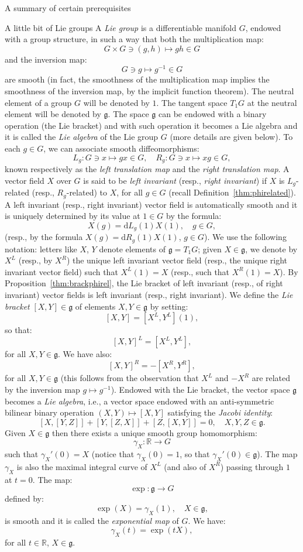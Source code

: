 \documentclass[oneside,a4paper,11pt]{amsbook}
\newcommand{\R}{\mathds R}
\newcommand{\dd}{\mathrm d}
\theoremstyle{remark}\newtheorem{exercise}{Exercise}[chapter]
\theoremstyle{plain}\newtheorem{teo}{Theorem}[section]
\theoremstyle{plain}\newtheorem{lem}[teo]{Lemma}
\theoremstyle{plain}\newtheorem{prop}[teo]{Proposition}
\theoremstyle{plain}\newtheorem{cor}[teo]{Corollary}
\theoremstyle{definition}\newtheorem{defin}[teo]{Definition}
\theoremstyle{remark}\newtheorem{rem}[teo]{Remark}
\theoremstyle{definition}\newtheorem{notation}[teo]{Notation}
\theoremstyle{definition}\newtheorem{convention}[teo]{Convention}
\theoremstyle{definition}\newtheorem{example}[teo]{Example}
\numberwithin{section}{chapter}
\numberwithin{equation}{section}
\begin{document}
\begin{chapter}{A summary of certain prerequisites}
\begin{section}{A little bit of Lie groups}
A {\em Lie group\/} is a differentiable manifold $G$, endowed with a group structure, in such a way that both the multiplication map:
\[G\times G\ni(g,h)\longmapsto gh\in G\]
and the inversion map:
\[G\ni g\longmapsto g^{-1}\in G\]
are smooth (in fact, the smoothness of the multiplication map
implies the smoothness of the inversion map, by the implicit function theorem). The neutral element of a group $G$ will be denoted by $1$. The tangent
space $T_1G$ at the neutral element will be denoted by $\mathfrak g$. The space $\mathfrak g$ can be endowed with a binary operation (the Lie bracket) and
with such operation it becomes a Lie algebra and it is called the {\em Lie algebra\/} of the Lie group $G$
(more details are given below). To each $g\in G$, we can associate smooth diffeomorphisms:
\[L_g:G\ni x\longmapsto gx\in G,\quad R_g:G\ni x\longmapsto xg\in G,\]
known respectively as the {\em left translation map\/} and the {\em right translation map}. A vector field $X$ over $G$ is said to be {\em left invariant\/}
(resp., {\em right invariant}) if $X$ is $L_g$-related (resp., $R_g$-related) to $X$, for all $g\in G$ (recall Definition~\ref{thm:phirelated}).
A left invariant (resp., right invariant) vector field is automatically smooth and it is uniquely determined by its value at $1\in G$ by the formula:
\[X(g)=\dd L_g(1)X(1),\quad g\in G,\]
(resp., by the formula $X(g)=\dd R_g(1)X(1)$, $g\in G$). We use the following notation: letters like $X$, $Y$ denote elements of $\mathfrak g=T_1G$;
given $X\in\mathfrak g$, we denote by $X^L$ (resp., by $X^R$) the unique left invariant vector field (resp., the unique right invariant vector field) such
that $X^L(1)=X$ (resp., such that
$X^R(1)=X$). By Proposition~\ref{thm:brackphirel}, the Lie bracket of left invariant (resp., of right invariant) vector fields is left invariant
(resp., right invariant). We define the {\em Lie bracket\/} $[X,Y]\in\mathfrak g$ of elements $X,Y\in\mathfrak g$ by setting:
\[[X,Y]=[X^L,Y^L](1),\]
so that:
\[[X,Y]^L=[X^L,Y^L],\]
for all $X,Y\in\mathfrak g$. We have also:
\begin{equation}\label{eq:brackR}
[X,Y]^R=-[X^R,Y^R],
\end{equation}
for all $X,Y\in\mathfrak g$ (this follows from the observation that $X^L$ and $-X^R$ are related by the inversion map $g\mapsto g^{-1}$).
Endowed with the Lie bracket, the vector space $\mathfrak g$ becomes a {\em Lie algebra}, i.e., a vector space endowed with an anti-symmetric
bilinear binary operation $(X,Y)\mapsto[X,Y]$ satisfying the {\em Jacobi identity}:
\[[X,[Y,Z]]+[Y,[Z,X]]+[Z,[X,Y]]=0,\quad X,Y,Z\in\mathfrak g.\]
Given $X\in\mathfrak g$ then there exists a unique smooth group homomorphism:
\[\gamma_X:\R\longrightarrow G\]
such that $\gamma_X'(0)=X$ (notice that $\gamma_X(0)=1$,
so that $\gamma_X'(0)\in\mathfrak g$). The map $\gamma_X$ is also the maximal integral curve of $X^L$ (and also of $X^R$) passing through $1$ at $t=0$.
The map:
\[\exp:\mathfrak g\longrightarrow G\]
defined by:
\[\exp(X)=\gamma_X(1),\quad X\in\mathfrak g,\]
is smooth and it is called the {\em exponential map\/} of $G$. We have:
\[\gamma_X(t)=\exp(tX),\]
for all $t\in\R$, $X\in\mathfrak g$.


\end{section}
\end{chapter}
\end{document}
